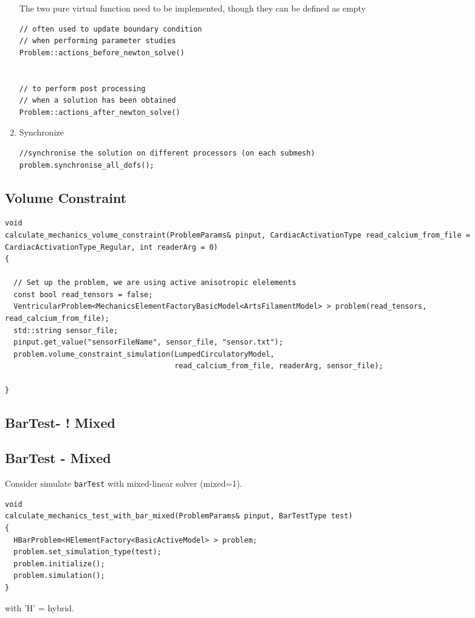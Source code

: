 \begin{enumerate}
The two pure virtual function need to be implemented, though they can be defined
as empty
\begin{verbatim}
// often used to update boundary condition
// when performing parameter studies
Problem::actions_before_newton_solve() 


// to perform post processing
// when a solution has been obtained
Problem::actions_after_newton_solve()
\end{verbatim}

  \item Synchronize
\begin{verbatim}
//synchronise the solution on different processors (on each submesh)
problem.synchronise_all_dofs();
\end{verbatim}


\end{enumerate}



\subsection{Volume Constraint}

\begin{verbatim}
void
calculate_mechanics_volume_constraint(ProblemParams& pinput, CardiacActivationType read_calcium_from_file = CardiacActivationType_Regular, int readerArg = 0)
{

  // Set up the problem, we are using active anisotropic elelements
  const bool read_tensors = false; 
  VentricularProblem<MechanicsElementFactoryBasicModel<ArtsFilamentModel> > problem(read_tensors, read_calcium_from_file);
  std::string sensor_file;
  pinput.get_value("sensorFileName", sensor_file, "sensor.txt");
  problem.volume_constraint_simulation(LumpedCirculatoryModel,
                                       read_calcium_from_file, readerArg, sensor_file);

}
\end{verbatim}
  
\subsection{BarTest- ! Mixed}
  
\subsection{BarTest - Mixed}
  
Consider simulate \verb!barTest! with mixed-linear solver (mixed=1).
  \begin{verbatim}
void
calculate_mechanics_test_with_bar_mixed(ProblemParams& pinput, BarTestType test)
{
  HBarProblem<HElementFactory<BasicActiveModel> > problem;
  problem.set_simulation_type(test);
  problem.initialize();
  problem.simulation();
}
  \end{verbatim}
with 'H' = hybrid.

